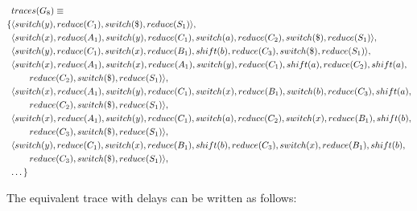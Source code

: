\documentclass[11pt]{article}
\begin{document}
\parbox{.3\textwidth}{\begin{align*}
&traces(G_8) \equiv \\
\{ & \langle switch(y), reduce(C_1), switch(\$), reduce(S_1) \rangle,\\
   & \langle switch(x), reduce(A_1), switch(y), reduce(C_1), switch(a), reduce(C_2), switch(\$), reduce(S_1) \rangle,\\
   & \langle switch(y), reduce(C_1), switch(x), reduce(B_1), shift(b), reduce(C_3), switch(\$), reduce(S_1) \rangle,\\
   & \langle switch(x), reduce(A_1), switch(x), reduce(A_1), switch(y), reduce(C_1), shift(a), reduce(C_2), shift(a), \\&\qquad reduce(C_2), switch(\$), reduce(S_1) \rangle,\\
   & \langle switch(x), reduce(A_1), switch(y), reduce(C_1), switch(x), reduce(B_1), switch(b), reduce(C_3), shift(a), \\&\qquad reduce(C_2), switch(\$), reduce(S_1) \rangle,\\
   & \langle switch(x), reduce(A_1), switch(y), reduce(C_1), switch(a), reduce(C_2), switch(x), reduce(B_1), shift(b), \\&\qquad reduce(C_3), switch(\$), reduce(S_1) \rangle,\\
   & \langle switch(y), reduce(C_1), switch(x), reduce(B_1), shift(b), reduce(C_3), switch(x), reduce(B_1), shift(b), \\&\qquad reduce(C_3), switch(\$), reduce(S_1) \rangle,\\
   & \textellipsis \}
\end{align*}}

The equivalent trace with delays can be written as follows:
\end{document}
